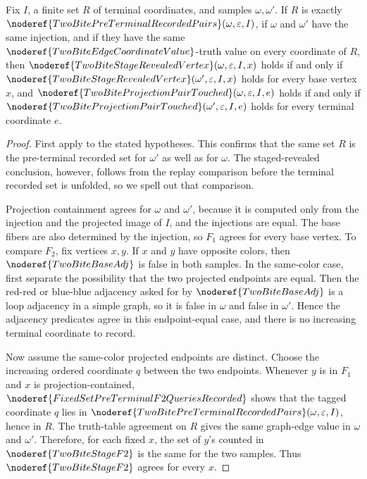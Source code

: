 \begin{helper}
Fix \(I\), a finite set \(R\) of terminal coordinates, and samples
\(\omega,\omega'\).  If \(R\) is exactly
\(\noderef{TwoBitePreTerminalRecordedPairs}(\omega,\varepsilon,I)\), if
\(\omega\) and \(\omega'\) have the same injection, and if they have the same
\(\noderef{TwoBiteEdgeCoordinateValue}\)-truth value on every coordinate of
\(R\), then
\(\noderef{TwoBiteStageRevealedVertex}(\omega,\varepsilon,I,x)\) holds if and
only if \(\noderef{TwoBiteStageRevealedVertex}(\omega',\varepsilon,I,x)\)
holds for every base vertex \(x\), and
\(\noderef{TwoBiteProjectionPairTouched}(\omega,\varepsilon,I,e)\) holds if
and only if
\(\noderef{TwoBiteProjectionPairTouched}(\omega',\varepsilon,I,e)\) holds for
every terminal coordinate \(e\).
\end{helper}
\begin{proof}
First apply  to the stated
hypotheses.  This confirms that the same set \(R\) is the pre-terminal
recorded set for \(\omega'\) as well as for \(\omega\).  The staged-revealed
conclusion, however, follows from the replay comparison before the terminal
recorded set is unfolded, so we spell out that comparison.

Projection containment agrees for \(\omega\) and \(\omega'\), because it is
computed only from the injection and the projected image of \(I\), and the
injections are equal.  The base fibers are also determined by the injection,
so \(F_1\) agrees for every base vertex.  To compare \(F_2\), fix vertices
\(x,y\).  If \(x\) and \(y\) have opposite colors, then
\(\noderef{TwoBiteBaseAdj}\) is false in both samples.  In the same-color
case, first separate the possibility that the two projected endpoints are
equal.  Then the red-red or blue-blue adjacency asked for by
\(\noderef{TwoBiteBaseAdj}\) is a loop adjacency in a simple graph, so it is
false in \(\omega\) and false in \(\omega'\).  Hence the adjacency predicates
agree in this endpoint-equal case, and there is no increasing terminal
coordinate to record.

Now assume the same-color projected endpoints are distinct.  Choose the
increasing ordered coordinate \(q\) between the two endpoints.  Whenever
\(y\) is in \(F_1\) and \(x\) is projection-contained,
\(\noderef{FixedSetPreTerminalF2QueriesRecorded}\) shows that the tagged
coordinate \(q\) lies in
\(\noderef{TwoBitePreTerminalRecordedPairs}(\omega,\varepsilon,I)\), hence in
\(R\).  The truth-table agreement on \(R\) gives the same graph-edge value in
\(\omega\) and \(\omega'\).  Therefore, for each fixed \(x\), the set of
\(y\)'s counted in \(\noderef{TwoBiteStageF2}\) is the same for the two
samples.  Thus \(\noderef{TwoBiteStageF2}\) agrees for every \(x\).


\end{proof}
